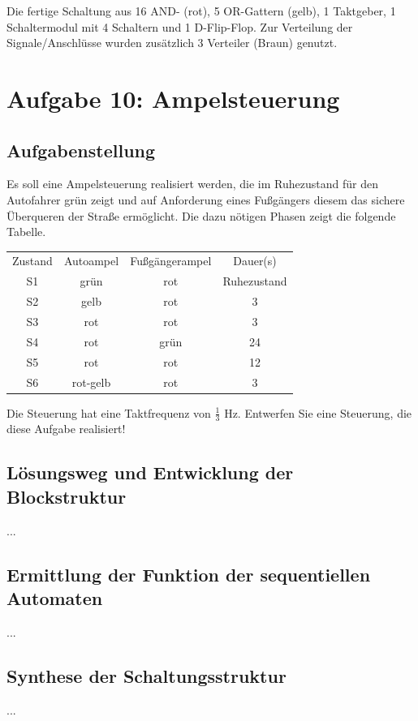 \documentclass[a4paper,12pt,titlepage]{scrartcl}
\begin{document}
Die fertige Schaltung aus 16 AND- (rot), 5 OR-Gattern (gelb), 1 Taktgeber, 1 Schaltermodul mit 4 Schaltern und 1 D-Flip-Flop. Zur Verteilung der Signale/Anschlüsse wurden zusätzlich 3 Verteiler (Braun) genutzt.

\newpage

\section*{Aufgabe 10: Ampelsteuerung}
\subsection*{Aufgabenstellung}
Es soll eine Ampelsteuerung realisiert werden, die im Ruhezustand für den Autofahrer grün zeigt und auf Anforderung eines Fußgängers diesem das sichere Überqueren der Straße ermöglicht. Die dazu nötigen Phasen zeigt die folgende Tabelle.

\begin{tabular}{c|c|c|c}
    Zustand & Autoampel & Fußgängerampel & Dauer(s)    \\
    S1      & grün      & rot            & Ruhezustand \\
    S2      & gelb      & rot            & 3           \\
    S3      & rot       & rot            & 3           \\
    S4      & rot       & grün           & 24          \\
    S5      & rot       & rot            & 12          \\
    S6      & rot-gelb  & rot            & 3
\end{tabular}

Die Steuerung hat eine Taktfrequenz von $\frac{1}{3}$ Hz.
Entwerfen Sie eine Steuerung, die diese Aufgabe realisiert!

\subsection*{Lösungsweg und Entwicklung der Blockstruktur}
...

\subsection*{Ermittlung der Funktion der sequentiellen Automaten}
...

\subsection*{Synthese der Schaltungsstruktur}
...
\end{document}
